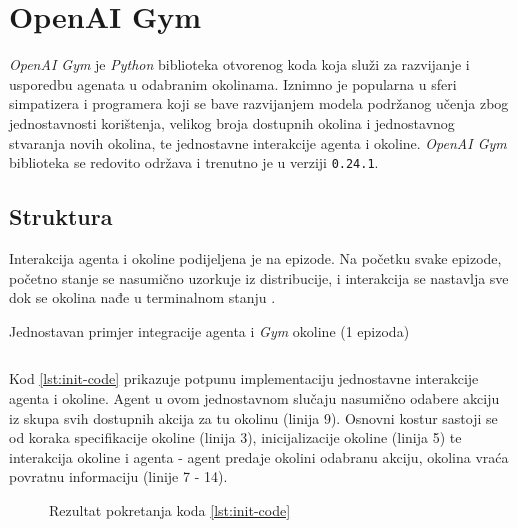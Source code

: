\chapter{OpenAI Gym}

\textit{OpenAI Gym} je \textit{Python} biblioteka  otvorenog koda  koja služi za razvijanje i usporedbu agenata u odabranim okolinama. Iznimno je popularna u sferi simpatizera i programera koji se bave razvijanjem modela podržanog učenja zbog jednostavnosti korištenja, velikog broja dostupnih okolina i jednostavnog stvaranja novih okolina, te jednostavne interakcije agenta i okoline. \textit{OpenAI Gym} biblioteka se redovito održava i trenutno je u verziji \texttt{0.24.1}. 

\section{Struktura}

Interakcija agenta i okoline podijeljena je na epizode. Na početku svake epizode, početno stanje se nasumično uzorkuje iz distribucije, i interakcija se nastavlja sve dok se okolina nađe u terminalnom stanju \cite{OpenAIWhitepaper}.

\begin{listing}[H]
    \caption{Jednostavan primjer integracije agenta i \textit{Gym} okoline (1 epizoda)}
    \inputminted{python}{snippets/init.py}
    \label{lst:init-code}
\end{listing}

Kod \ref{lst:init-code} prikazuje potpunu implementaciju jednostavne interakcije agenta i okoline. Agent u ovom jednostavnom slučaju nasumično odabere akciju iz skupa svih dostupnih akcija za tu okolinu (linija 9). Osnovni kostur sastoji se od koraka specifikacije okoline (linija 3), inicijalizacije okoline (linija 5) te interakcija okoline i agenta - agent predaje okolini odabranu akciju, okolina vraća povratnu informaciju (linije 7 - 14). 

\begin{figure}[h]
    \centering
    \caption{Rezultat pokretanja koda \ref{lst:init-code}}
    \label{fig:mountain-car}
\end{figure}

